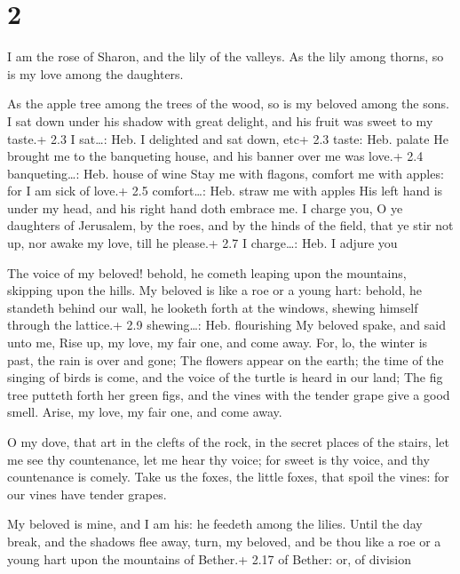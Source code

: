 \hypertarget{section-1}{%
\section{2}\label{section-1}}

 I am the rose of Sharon, and the lily of the valleys.
 As the lily among thorns, so is my love among the
daughters.

 As the apple tree among the trees of the wood, so is my
beloved among the sons. I sat down under his shadow with great delight,
and his fruit was sweet to my taste.+ 2.3 I sat\ldots: Heb. I delighted
and sat down, etc+ 2.3 taste: Heb. palate  He brought me to
the banqueting house, and his banner over me was love.+ 2.4
banqueting\ldots: Heb. house of wine  Stay me with flagons,
comfort me with apples: for I am sick of love.+ 2.5 comfort\ldots: Heb.
straw me with apples  His left hand is under my head, and
his right hand doth embrace me.  I charge you, O ye
daughters of Jerusalem, by the roes, and by the hinds of the field, that
ye stir not up, nor awake my love, till he please.+ 2.7 I charge\ldots:
Heb. I adjure you

 The voice of my beloved! behold, he cometh leaping upon
the mountains, skipping upon the hills.  My beloved is like
a roe or a young hart: behold, he standeth behind our wall, he looketh
forth at the windows, shewing himself through the lattice.+ 2.9
shewing\ldots: Heb. flourishing  My beloved spake, and said
unto me, Rise up, my love, my fair one, and come away. 
For, lo, the winter is past, the rain is over and gone; 
The flowers appear on the earth; the time of the singing of birds is
come, and the voice of the turtle is heard in our land; 
The fig tree putteth forth her green figs, and the vines with the tender
grape give a good smell. Arise, my love, my fair one, and come away.

 O my dove, that art in the clefts of the rock, in the
secret places of the stairs, let me see thy countenance, let me hear thy
voice; for sweet is thy voice, and thy countenance is comely.
 Take us the foxes, the little foxes, that spoil the vines:
for our vines have tender grapes.

 My beloved is mine, and I am his: he feedeth among the
lilies.  Until the day break, and the shadows flee away,
turn, my beloved, and be thou like a roe or a young hart upon the
mountains of Bether.+ 2.17 of Bether: or, of division

